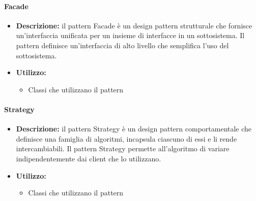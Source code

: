 \paragraph{Facade}
\begin{itemize}
    \item{\textbf{Descrizione:}} il pattern Facade è un design pattern strutturale che fornisce un'interfaccia unificata per un insieme di interfacce in un sottosistema. Il pattern definisce un'interfaccia di alto livello che semplifica l'uso del sottosistema.
    \item{\textbf{Utilizzo:}}
    \begin{itemize}
        \item Classi che utilizzano il pattern
    \end{itemize}
\end{itemize}

\paragraph{Strategy}
\begin{itemize}
    \item{\textbf{Descrizione:}} il pattern Strategy è un design pattern comportamentale che definisce una famiglia di algoritmi, incapsula ciascuno di essi e li rende intercambiabili. Il pattern Strategy permette all'algoritmo di variare indipendentemente dai client che lo utilizzano.
    \item{\textbf{Utilizzo:}}
    \begin{itemize}
        \item Classi che utilizzano il pattern
    \end{itemize}
\end{itemize}